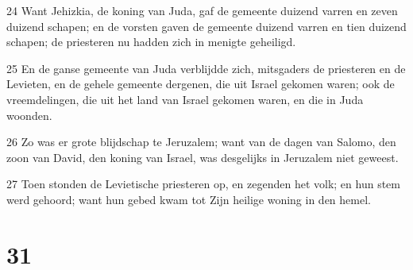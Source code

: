 \par 24 Want Jehizkia, de koning van Juda, gaf de gemeente duizend varren en zeven duizend schapen; en de vorsten gaven de gemeente duizend varren en tien duizend schapen; de priesteren nu hadden zich in menigte geheiligd.
\par 25 En de ganse gemeente van Juda verblijdde zich, mitsgaders de priesteren en de Levieten, en de gehele gemeente dergenen, die uit Israel gekomen waren; ook de vreemdelingen, die uit het land van Israel gekomen waren, en die in Juda woonden.
\par 26 Zo was er grote blijdschap te Jeruzalem; want van de dagen van Salomo, den zoon van David, den koning van Israel, was desgelijks in Jeruzalem niet geweest.
\par 27 Toen stonden de Levietische priesteren op, en zegenden het volk; en hun stem werd gehoord; want hun gebed kwam tot Zijn heilige woning in den hemel.

\chapter{31}

